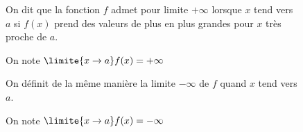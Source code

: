 \documentclass[a4paper,11pt,reqno,french,dvipsnames,table]{article}
\newcommand{\trou}[1]{\textcolor{white}{#1}}
\begin{document}
\begin{boiteDefinition}[title={Définition : limite infinie}]
\begin{figure}[H]
\begin{minipage}[c]{.5\linewidth}
			On dit que la fonction $f$ admet pour limite $+\infty$ lorsque $x$ tend vers $a$ si $f(x)$ prend des valeurs de plus en plus grandes  pour $x$ très proche de $a$.
			
			On note \trou{$\limite{x \to a} f(x) = +\infty$.}
			
			\vspace{10pt}
			
			On définit de la même manière la limite $-\infty$ de $f$ quand $x$ tend vers $a$.
			
			On note \trou{$\limite{x \to a} f(x) = -\infty$.}
			
		\end{minipage}
	\end{figure}
	
\end{boiteDefinition}
\end{document}
